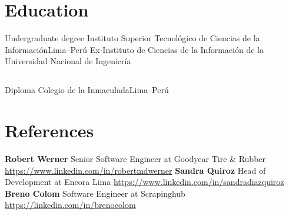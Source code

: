 \documentclass[11pt,a4paper,english]{moderncv}
\begin{document}
\section{Education}
    {Undergraduate degree}
    {Instituto Superior Tecnológico de Ciencias de la Información}{Lima--Perú}
    {}{Ex-Instituto de Ciencias de la Información de la Universidad Nacional de Ingeniería}

\subsection{}

    {Diploma}
    {Colegio de la Inmaculada}{Lima--Perú}
    {}{}

\subsection{}

\section{References}
\cvlistitem
{
    \textbf{Robert Werner}
    \newline{}
    Senior Software Engineer at Goodyear Tire \& Rubber
    \newline{}
    \url{https://www.linkedin.com/in/robertmdwerner}
}
\cvlistitem
{
    \textbf{Sandra Quiroz}
    \newline{}
    Head of Development at Encora Lima
    \newline{}
    \url{https://www.linkedin.com/in/sandradiazquiroz}
}
\cvlistitem
{
    \textbf{Breno Colom}
    \newline{}
    Software Engineer at Scrapinghub
    \newline{}
    \url{https://linkedin.com/in/brenocolom}
}
\end{document}
